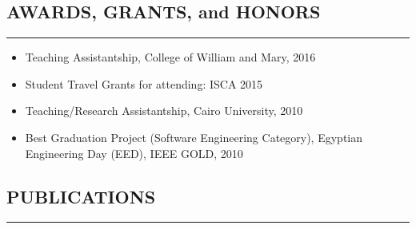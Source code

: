 \documentclass[10pt,a4]{article}
\begin{document}
\begin{itemize}


\end{itemize}

\subsection*{AWARDS, GRANTS, and HONORS}
\hrule
\vspace{0.2cm}
\begin{itemize}
\item Teaching Assistantship, College of William and Mary, 2016
\item Student Travel Grants for attending: ISCA 2015
\item Teaching/Research Assistantship, Cairo University, 2010
\item Best Graduation Project (Software Engineering Category), Egyptian Engineering Day (EED), IEEE GOLD, 2010
\end{itemize}

\subsection*{PUBLICATIONS}
\hrule
\vspace{0.2cm}
 
\end{document}
